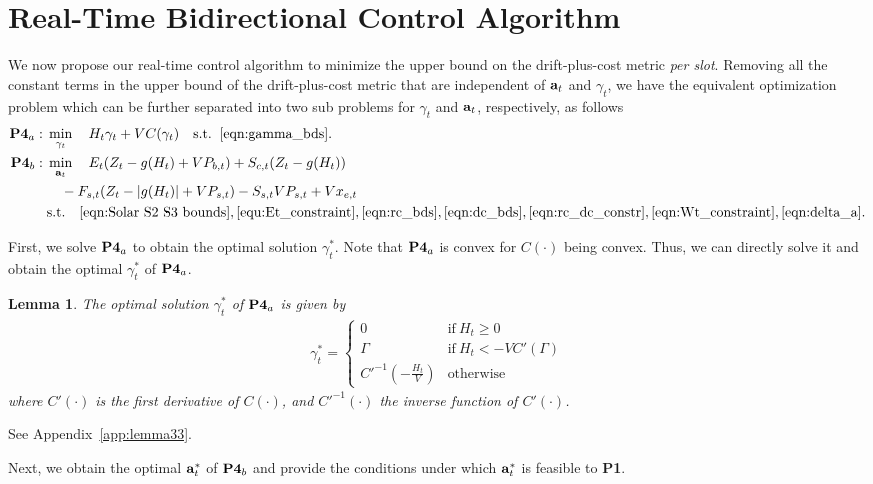 \documentclass[journal]{IEEEtran}
\def\abf{{\bf a}}
\def\nn{\nonumber}
\newtheorem{lemma}{Lemma}
\begin{document}
\section{Real-Time Bidirectional  Control Algorithm}\label{sec:RT alg}
We now propose our real-time control algorithm  to minimize the upper bound on the drift-plus-cost metric \emph{per slot}.
Removing all the constant terms in the upper bound of the drift-plus-cost metric that are independent of $\abf_t$ and $\gamma_t$, we have the equivalent optimization problem which can be further separated into two sub problems for $\gamma_t$ and $\abf_t$, respectively, as follows
\begin{align}
 \text{\bf P4}_a:\; &\min_{\gamma_t}
\quad H_t\gamma_t+VC(\gamma_t)
\quad \textrm{s.t.} \;\; \eqref{eqn:gamma_bds}.\nn\\
\text{\bf P4}_b:\; &\min_{\abf_t}
  \quad
E_t(Z_t-g(H_t)+VP_{b,t})+S_{c,t}(Z_t-g(H_t))\nn\\
  &\quad -F_{s,t}(Z_t-|g(H_t)|+VP_{s,t})-S_{s,t}VP_{s,t}+Vx_{e,t} \nn\\
  &\textrm{s.t.} \quad
    \eqref{eqn:Solar S2 S3 bounds},\eqref{equ:Et_constraint},\eqref{eqn:rc_bds},\eqref{eqn:dc_bds},\eqref{eqn:rc_dc_constr},\eqref{eqn:Wt_constraint},\eqref{eqn:delta_a}.\nn
\end{align}


First, we solve $\text{\bf P4}_a$ to obtain the optimal solution $\gamma_t^*$.
Note that $\text{\bf P4}_{a}$ is convex for $C(\cdot)$ being convex. Thus, we can directly solve it and  obtain the optimal  $\gamma^*_t$  of $\text{\bf P4}_a$.
\begin{lemma}\label{lemma33}
The optimal solution $\gamma^*_t$ of $\text{\bf P4}_a$ is given by
\begin{align}
\label{eqn:optimal gamma}
\gamma^*_t=
    \begin{cases}
        0&\text{if}\ H_t\geq 0\\
        \Gamma& \text{if}\ H_t< -VC'(\Gamma)\\
        C'^{-1}\left(-\frac{H_t}{V}\right)&\text{otherwise}
    \end{cases}
\end{align}
where $C'(\cdot)$ is the first derivative of $C(\cdot)$, and $C'^{-1}(\cdot)$  the inverse function of $C'(\cdot)$.
\end{lemma}
\IEEEproof
See Appendix~\ref{app:lemma33}.
\endIEEEproof


Next, we obtain the optimal $\abf_t^*$ of $\text{\bf P4}_{b}$ and provide the conditions under which  $\abf_t^*$ is feasible to {\bf P1}.
\end{document}
